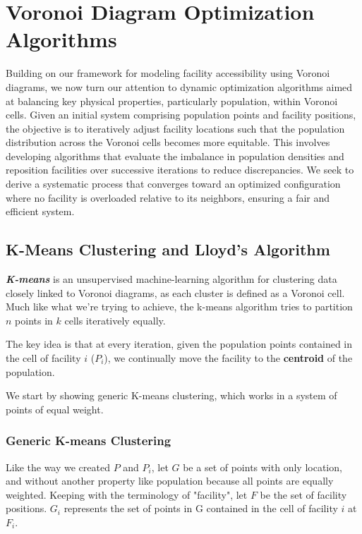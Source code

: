 \documentclass{article}
\begin{document}
\vspace{15pt}
\section{Voronoi Diagram Optimization Algorithms}

Building on our framework for modeling facility accessibility using Voronoi diagrams, we now turn our attention to dynamic optimization algorithms aimed at balancing key physical properties, particularly population, within Voronoi cells. Given an initial system comprising population points and facility positions, the objective is to iteratively adjust facility locations such that the population distribution across the Voronoi cells becomes more equitable. This involves developing algorithms that evaluate the imbalance in population densities and reposition facilities over successive iterations to reduce discrepancies. We seek to derive a systematic process that converges toward an optimized configuration where no facility is overloaded relative to its neighbors, ensuring a fair and efficient system.

\subsection{K-Means Clustering and Lloyd's Algorithm}

\textit{\textbf{K-means}} is an unsupervised machine-learning algorithm for clustering data closely linked to Voronoi diagrams, as each cluster is defined as a Voronoi cell. Much like what we're trying to achieve, the k-means algorithm tries to partition $n$ points in $k$ cells iteratively equally.

The key idea is that at every iteration, given the population points contained in the cell of facility $i$ ($P_i$), we continually move the facility to the \textbf{centroid} of the population. 

We start by showing generic K-means clustering, which works in a system of points of equal weight.

\subsubsection*{Generic K-means Clustering}
Like the way we created $P$ and $P_i$, let $G$ be a set of points with only location, and without another property like population because all points are equally weighted. Keeping with the terminology of "facility", let $F$ be the set of facility positions. $G_i$ represents the set of points in G contained in the cell of facility $i$ at $F_i$. 
\end{document}
